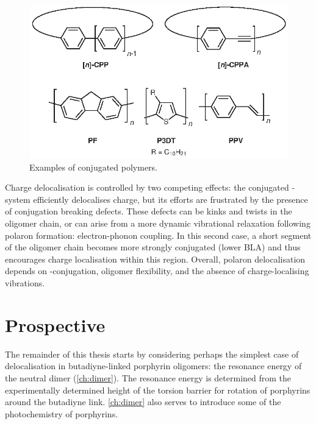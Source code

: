 		\begin{figure}[ht!]
			\centering\includegraphics{figures/intro/polymers.eps} 
			\caption[]{Examples of conjugated polymers.}
			\label{fig:intro:polymers}
		\end{figure}

		Charge delocalisation is controlled by two competing effects: the conjugated \pii{}-system efficiently delocalises charge, but its efforts are frustrated by the presence of conjugation breaking defects. These defects can be kinks and twists in the oligomer chain,\autocite{Grozema2002} or can arise from a more dynamic vibrational relaxation following polaron formation: electron-phonon coupling. In this second case, a short segment of the oligomer chain becomes more strongly conjugated (lower BLA) and thus encourages charge localisation within this region.\autocite{Takeda2012} Overall, polaron delocalisation depends on \pii{}-conjugation, oligomer flexibility, and the absence of charge-localising vibrations.



	\section{Prospective}

		The remainder of this thesis starts by considering perhaps the simplest case of delocalisation in butadiyne-linked porphyrin oligomers: the resonance energy of the neutral dimer  (\autoref{ch:dimer}). The resonance energy is determined from the experimentally determined height of the torsion barrier for rotation of porphyrins around the butadiyne link. \autoref{ch:dimer} also serves to introduce some of the photochemistry of porphyrins. 

